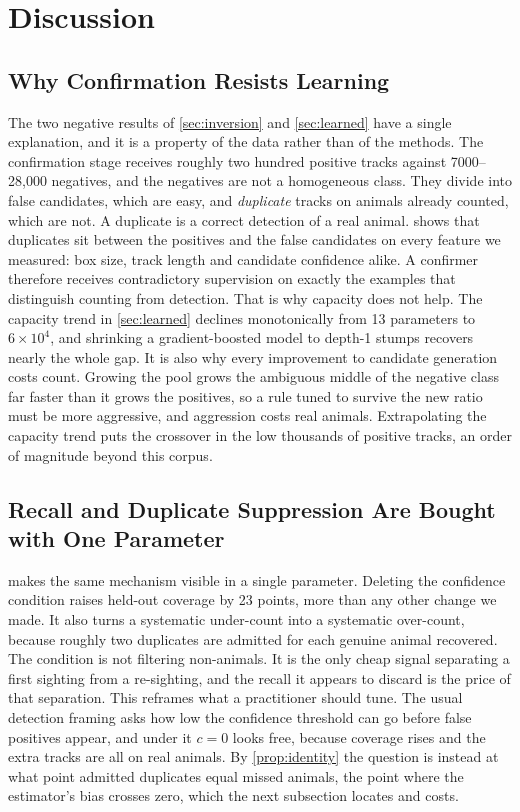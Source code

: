 \section{Discussion}
\label{sec:discussion}

\subsection{Why Confirmation Resists Learning}

The two negative results of \cref{sec:inversion} and \cref{sec:learned} have a single
explanation, and it is a property of the data rather than of the methods. The confirmation
stage receives roughly two hundred positive tracks against 7000--28,000 negatives, and the
negatives are not a homogeneous class. They divide into false candidates, which are easy,
and \emph{duplicate} tracks on animals already counted, which are not. A duplicate is a
correct detection of a real animal.  shows that duplicates sit between
the positives and the false candidates on every feature we measured: box size, track
length and candidate confidence alike. A confirmer therefore receives contradictory
supervision on exactly the examples that distinguish counting from detection. That is why
capacity does not help. The capacity trend in \cref{sec:learned} declines monotonically
from 13 parameters to $6\times10^4$, and shrinking a gradient-boosted model to depth-1
stumps recovers nearly the whole gap. It is also why every improvement to candidate
generation costs count. Growing the pool grows the ambiguous middle of the negative class
far faster than it grows the positives, so a rule tuned to survive the new ratio must be
more aggressive, and aggression costs real animals. Extrapolating the capacity trend puts
the crossover in the low thousands of positive tracks, an order of magnitude beyond this corpus.

\subsection{Recall and Duplicate Suppression Are Bought with One Parameter}

 makes the same mechanism visible in a single parameter. Deleting the confidence condition
raises held-out coverage by 23 points, more than any other change we made. It also turns a
systematic under-count into a systematic over-count, because roughly two duplicates are
admitted for each genuine animal recovered. The condition is not filtering non-animals. It
is the only cheap signal separating a first sighting from a re-sighting, and the recall it
appears to discard is the price of that separation. This reframes what a practitioner
should tune. The usual detection framing asks how low the confidence threshold can go
before false positives appear, and under it $c=0$ looks free, because coverage rises and
the extra tracks are all on real animals. By \cref{prop:identity} the question is instead
at what point admitted duplicates equal missed animals, the point where the estimator's
bias crosses zero, which the next subsection locates and costs.

